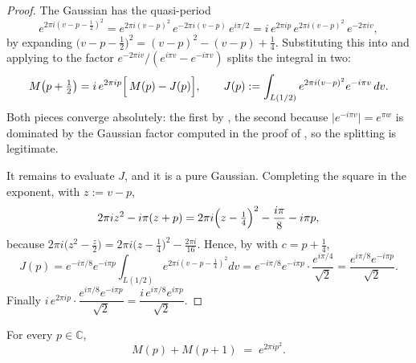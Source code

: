 \begin{proof}
\leanok
{}
The Gaussian has the quasi-period
\[
  e^{2\pi i\left(v-p-\frac12\right)^{2}}
  =e^{2\pi i(v-p)^{2}}\,e^{-2\pi i(v-p)}\,e^{i\pi/2}
  =i\,e^{2\pi ip}\,e^{2\pi i(v-p)^{2}}\,e^{-2\pi iv},
\]
by expanding $\bigl(v-p-\tfrac12\bigr)^{2}=(v-p)^{2}-(v-p)+\tfrac14$.  Substituting this into
 and applying  to the factor
$e^{-2\pi iv}/(e^{i\pi v}-e^{-i\pi v})$ splits the integral in two:
\[
  M\bigl(p+\tfrac12\bigr)=i\,e^{2\pi ip}\Bigl[\,M(p)-J(p)\Bigr],\qquad
  J(p):=\int_{L(1/2)}e^{2\pi i(v-p)^{2}}e^{-i\pi v}\,dv .
\]
Both pieces converge absolutely: the first by , the second because
$\lvert e^{-i\pi v}\rvert=e^{\pi w}$ is dominated by the Gaussian factor computed in the proof
of , so the splitting is legitimate.

It remains to evaluate $J$, and it is a pure Gaussian.  Completing the square in the exponent,
with $z:=v-p$,
\[
  2\pi iz^{2}-i\pi(z+p)=2\pi i\Bigl(z-\tfrac14\Bigr)^{2}-\frac{i\pi}{8}-i\pi p ,
\]
because $2\pi i\bigl(z^{2}-\tfrac z2\bigr)=2\pi i\bigl(z-\tfrac14\bigr)^{2}-\tfrac{2\pi i}{16}$.
Hence, by  with $c=p+\tfrac14$,
\[
  J(p)=e^{-i\pi/8}e^{-i\pi p}\int_{L(1/2)}e^{2\pi i\left(v-p-\frac14\right)^{2}}dv
      =e^{-i\pi/8}e^{-i\pi p}\cdot\frac{e^{i\pi/4}}{\sqrt2}
      =\frac{e^{i\pi/8}e^{-i\pi p}}{\sqrt2}.
\]
Finally $i\,e^{2\pi ip}\cdot\dfrac{e^{i\pi/8}e^{-i\pi p}}{\sqrt2}=\dfrac{i\,e^{i\pi/8}e^{i\pi p}}{\sqrt2}$.
\end{proof}

\begin{lemma}
\label{lem:rsf_unit_shift}
\leanok
{}
For every $p\in\mathbb{C}$,
\[
  M(p)+M(p+1)\;=\;e^{2\pi ip^{2}} .
\]
\end{lemma}

